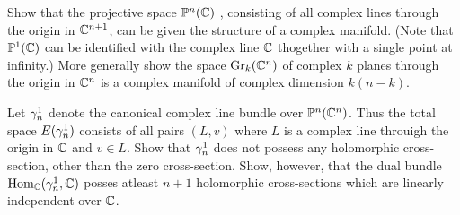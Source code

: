 \documentclass[../main]{subfiles}
\begin{document}
\begin{problem}
\label{prob:13.D} Show that the projective space $\mathbb{P}^n(\mathbb{C})$ , consisting of all complex lines through the origin in $\mathbb C^{n+1}$, can be given the structure of a complex manifold. (Note that $\mathbb{P}^1(\mathbb C)$ can be identified with the complex line $\mathbb C$ thogether with a single point at infinity.) More generally show the space $\operatorname{Gr}_k(\mathbb C^n)$ of complex $k$ planes through the origin in $\mathbb C^n$ is a complex manifold of complex dimension $k(n-k)$.
\end{problem}

\begin{problem}
\label{prob:13.E} Let $\gamma^1_n$ denote the canonical complex line bundle over $\mathbb{P}^n(\mathbb{C}^n)$. Thus the total space $E(\gamma^1_n)$ consists of all pairs $(L,v)$ where $L$ is a complex line throuigh the origin in $\mathbb C$ and $v\in L$. Show that $\gamma_n^1$ does not possess any holomorphic cross-section, other than the zero cross-section. Show, however, that the dual bundle $\operatorname{Hom}_\mathbb C(\gamma_n^1,\mathbb C)$ posses atleast $n+1$ holomorphic cross-sections which are linearly independent over $\mathbb C$.
\end{problem}
\end{document}
